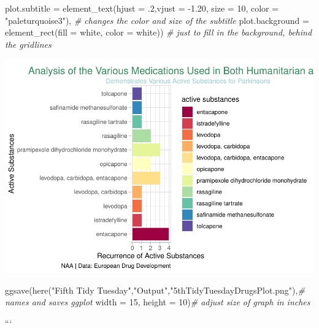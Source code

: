 \documentclass[
]{article}
\newenvironment{Shaded}{\begin{snugshade}}{\end{snugshade}}
\newcommand{\AttributeTok}[1]{\textcolor[rgb]{0.77,0.63,0.00}{#1}}
\newcommand{\CommentTok}[1]{\textcolor[rgb]{0.56,0.35,0.01}{\textit{#1}}}
\newcommand{\DecValTok}[1]{\textcolor[rgb]{0.00,0.00,0.81}{#1}}
\newcommand{\FloatTok}[1]{\textcolor[rgb]{0.00,0.00,0.81}{#1}}
\newcommand{\FunctionTok}[1]{\textcolor[rgb]{0.00,0.00,0.00}{#1}}
\newcommand{\NormalTok}[1]{#1}
\newcommand{\SpecialCharTok}[1]{\textcolor[rgb]{0.00,0.00,0.00}{#1}}
\newcommand{\StringTok}[1]{\textcolor[rgb]{0.31,0.60,0.02}{#1}}
\begin{document}
\begin{Shaded}
\begin{Highlighting}[]
        \AttributeTok{plot.subtitle =} \FunctionTok{element\_text}\NormalTok{(}\AttributeTok{hjust =}\NormalTok{ .}\DecValTok{2}\NormalTok{,}\AttributeTok{vjust =} \SpecialCharTok{{-}}\FloatTok{1.20}\NormalTok{, }\AttributeTok{size =} \DecValTok{10}\NormalTok{, }\AttributeTok{color =} \StringTok{"paleturquoise3"}\NormalTok{), }\CommentTok{\# changes the color and size of the subtitle}
        \AttributeTok{plot.background =} \FunctionTok{element\_rect}\NormalTok{(}\AttributeTok{fill =} \StringTok{\textquotesingle{}white\textquotesingle{}}\NormalTok{, }\AttributeTok{color =} \StringTok{\textquotesingle{}white\textquotesingle{}}\NormalTok{)) }\CommentTok{\# just to fill in the background, behind the gridlines}
\end{Highlighting}
\end{Shaded}

\includegraphics{../Output/unnamed-chunk-3-1.pdf}

\begin{Shaded}
\begin{Highlighting}[]
\FunctionTok{ggsave}\NormalTok{(}\FunctionTok{here}\NormalTok{(}\StringTok{"Fifth Tidy Tuesday"}\NormalTok{,}\StringTok{"Output"}\NormalTok{,}\StringTok{"5thTidyTuesdayDrugsPlot.png"}\NormalTok{),}\CommentTok{\# names and saves ggplot}
       \AttributeTok{width =} \DecValTok{15}\NormalTok{, }\AttributeTok{height =} \DecValTok{10}\NormalTok{)}\CommentTok{\# adjust size of graph in inches}
\end{Highlighting}
\end{Shaded}

```
\end{document}
